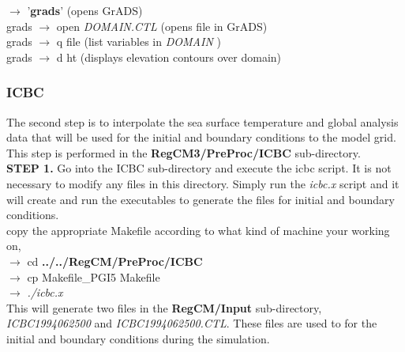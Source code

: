 \indent
$\rightarrow$   '{\bf grads}'  (opens GrADS) \\ 

\indent
grads $\rightarrow$   open {\it DOMAIN.CTL} (opens file in GrADS) \\
\indent
grads $\rightarrow$   q file  (list variables in {\it DOMAIN} ) \\
\indent
grads $\rightarrow$   d ht  (displays elevation contours over domain) \\


\subsubsection{ICBC}
\noindent
The second step is to interpolate the sea surface temperature and global analysis data that will be used for the initial and boundary conditions to the model grid.  This step is performed in the {\bf RegCM3/PreProc/ICBC} sub-directory.  \\

\noindent
{\bf STEP 1.}  Go into the ICBC sub-directory and execute the icbc script. It is not necessary to modify any files in this directory.  Simply run the {\it icbc.x} script and it will create and run the executables to generate the files for initial and boundary conditions.   \\

\noindent
copy the appropriate Makefile according to what kind of machine your working on, \\

\indent 
$\rightarrow$ cd {\bf ../../RegCM/PreProc/ICBC} \\
\indent 
$\rightarrow$   {cp Makefile\_PGI5 Makefile} \\ 
\indent 
$\rightarrow$   {\it ./icbc.x} \\

\noindent
This will generate two files in the {\bf RegCM/Input} 
sub-directory, {\it ICBC1994062500} and {\it ICBC1994062500.CTL}. 
These files are used to 
for the initial and boundary conditions during the simulation.


